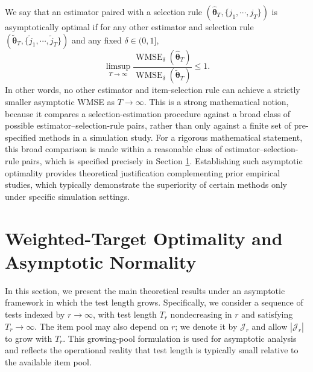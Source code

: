 \documentclass[12pt]{article}
\newcommand{\bftheta}{\boldsymbol{\theta}}
\begin{document}
We say that an estimator paired with a selection rule $(\hat{\bftheta}_T, \{j_1,\cdots, j_T\})$ is asymptotically optimal if for any other estimator and selection rule $(\tilde{\bftheta}_T, \{\tilde{j}_1,\cdots, \tilde{j}_T\})$ and any fixed $\delta \in (0,1]$, 
\[\limsup_{T\to\infty}\frac{\operatorname{WMSE}_{\delta}(\widehat{\boldsymbol{\theta}}_T)}{\operatorname{WMSE}_{\delta}(\widetilde{\boldsymbol{\theta}}_T)}\leq 1.\]
In other words, no other estimator and item-selection rule can achieve a strictly smaller asymptotic WMSE as $T\to\infty$. This is a strong mathematical notion, because it compares a selection-estimation procedure against a broad class of possible estimator--selection-rule pairs, rather than only against a finite set of pre-specified methods in a simulation study. For a rigorous mathematical statement, this broad comparison is made within a reasonable class of estimator--selection-rule pairs, which is specified precisely in Section \ref{sec:theory}. Establishing such asymptotic optimality provides theoretical justification complementing prior empirical studies, which typically demonstrate the superiority of certain methods only under specific simulation settings.


\section{Weighted-Target Optimality and Asymptotic Normality}
\label{sec:theory}
In this section, we present the main theoretical results under an asymptotic framework in which the test length grows. Specifically, we consider a sequence of tests indexed by $r\to\infty$, with test length $T_r$ nondecreasing in $r$ and satisfying $T_r\to\infty$. The item pool may also depend on $r$; we denote it by $\mathcal{J}_r$ and allow $|\mathcal{J}_r|$ to grow with $T_r$. This growing-pool formulation is used for asymptotic analysis and reflects the operational reality that test length is typically small relative to the available item pool.
\end{document}
